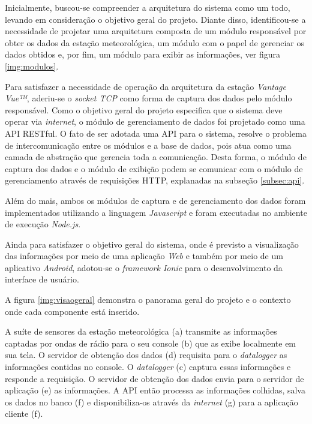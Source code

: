 Inicialmente, buscou-se compreender a arquitetura do sistema como um todo, levando em consideração o objetivo geral do projeto. Diante disso, identificou-se a necessidade de projetar uma arquitetura composta de um módulo responsável por obter os dados da estação meteorológica, um módulo com o papel de gerenciar os dados obtidos e, por fim, um módulo para exibir as informações, ver figura \ref{img:modulos}.

\newpage
Para satisfazer a necessidade de operação da arquitetura da estação \textit{Vantage Vue™}, aderiu-se o \textit{socket TCP} como forma de captura dos dados pelo módulo responsável. Como o objetivo geral do projeto especifica que o sistema deve operar via \textit{internet}, o módulo de gerenciamento de dados foi projetado como uma API RESTful. O fato de ser adotada uma API para o sistema, resolve o problema de intercomunicação entre os módulos e a base de dados, pois atua como uma camada de abstração que gerencia toda a comunicação. Desta forma, o módulo de captura dos dados e o módulo de exibição podem se comunicar com o módulo de gerenciamento através de requisições HTTP, explanadas na subseção \ref{subsec:api}.

Além do mais, ambos os módulos de captura e de gerenciamento dos dados foram implementados utilizando a linguagem \textit{Javascript} e foram executadas no ambiente de execução \textit{Node.js}.
 
Ainda para satisfazer o objetivo geral do sistema, onde é previsto a visualização das informações por meio de uma aplicação \textit{Web} e também por meio de um aplicativo \textit{Android}, adotou-se o \textit{framework Ionic} para o desenvolvimento da interface de usuário.

A figura \ref{img:visaogeral}  demonstra o panorama geral do projeto e o contexto onde cada componente está inserido.



A suíte de sensores da estação meteorológica (a) transmite as informações captadas por ondas de rádio para o seu console (b) que as exibe localmente em sua tela. O servidor de obtenção dos dados (d) requisita para o \textit{datalogger} as informações contidas no console. O \textit{datalogger} (c) captura essas informações e responde a requisição. O servidor de obtenção dos dados envia para o servidor de aplicação (e) as informações. A API então processa as informações colhidas, salva os dados no banco (f) e disponibiliza-os através da \textit{internet} (g) para a aplicação cliente (f).



